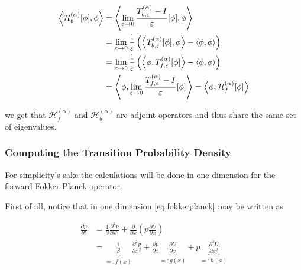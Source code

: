 \begin{equation*}\begin{aligned}
\left\langle \mathcal{H}_b^{(\alpha)}[\phi],\phi \right\rangle &=
\left\langle \lim_{\varepsilon\rightarrow 0}\frac{T_{b,\varepsilon}^{(\alpha)}-I}{\varepsilon}[\phi], \phi \right\rangle\\
&=\lim_{\varepsilon\rightarrow 0} \frac{1}{\varepsilon} \left( \left\langle T_{b,\varepsilon}^{(\alpha)}[\phi], \phi \right\rangle - \left\langle \phi, \phi \right\rangle \right) \\
&=\lim_{\varepsilon\rightarrow 0} \frac{1}{\varepsilon} \left( \left\langle \phi, T_{f,\varepsilon}^{(\alpha)}[\phi] \right\rangle - \left\langle \phi, \phi \right\rangle \right) \\
&=\left\langle \phi, \lim_{\varepsilon\rightarrow 0}\frac{T_{f,\varepsilon}^{(\alpha)}-I}{\varepsilon}[\phi] \right\rangle
= \left\langle \phi, \mathcal{H}_f^{(\alpha)}[\phi] \right\rangle
\end{aligned}\end{equation*}

we get that $\mathcal{H}_f^{(\alpha)}$ and $\mathcal{H}_b^{(\alpha)}$ are adjoint operators and thus share the same set of eigenvalues.

\subsubsection{Computing the Transition Probability Density}
For simplicity's sake the calculations will be done in one dimension for the forward Fokker-Planck operator.

First of all, notice that in one dimension \eqref{eq:fokkerplanck} may be written as

\begin{equation}\label{eq:fFP1D}\begin{aligned}
\frac{\partial p}{\partial t} &= \frac{1}{\beta}\frac{\partial^2 p}{\partial x^2} + \frac{\partial}{\partial x}\left(p \frac{\partial U}{\partial x} \right)\\
&=\underbrace{\frac{1}{\beta}}_{=:f(x)}\frac{\partial^2 p}{\partial x^2} + \frac{\partial p}{\partial x}\underbrace{\frac{\partial U}{\partial x}}_{=:g(x)} + p\underbrace{\frac{\partial^2 U}{\partial x^2}}_{=:h(x)}
\end{aligned}\end{equation}

